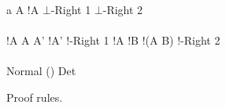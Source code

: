 \begin{FIGURE}
\begin{RULES}
     \ONEPREMISERULENAMEDRIGHT
     {
       a \notin A
     }
     {
       !A \AND {} \judge \bot
     }{$\bot$-Right 1}
        \qquad
     \ZEROPREMISERULENAMEDRIGHT
     {
        \judge \bot
     }{$\bot$-Right 2}
     \\\\
     \TWOPREMISERULENAMEDRIGHT
     {
       \phi \judge !A
     }
     {
       A \subseteq A'
     }
     {
       \phi \judge!A'
     }{!-Right 1}
     \qquad
     \TWOPREMISERULENAMEDRIGHT
     {
       \phi \judge !A
     }
     {
       \phi \judge !B
     }
     {
       \phi \judge !(A \cap B)
     }{!-Right 2}
     \\\\
     \ONEPREMISERULENAMEDRIGHT
     {
       \phi \judge \psi
     }
     {
        \judge {}
     }{Normal}
     \qquad
     \ONEPREMISERULENAMEDRIGHT
     {
       \phi \judge {}\psi \land {}\xi
     }
     {
       \phi \judge {}(\psi \land \xi)
     }{Det}
\end{RULES}
\caption{Proof rules.}\label{figure:elAndBangRules}
\end{FIGURE}
